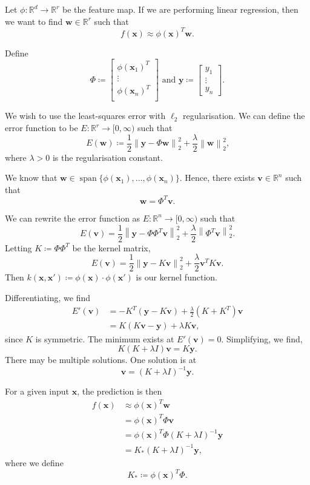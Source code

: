 \documentclass[11pt,twoside]{report}
\newcommand\bv{\mathbf{v}}
\newcommand\bw{\mathbf{w}}
\newcommand\bx{\mathbf{x}}
\newcommand\by{\mathbf{y}}
\newcommand\bbR{\mathbb{R}}
\newcommand\norm[1]{\left\|#1\right\|}
\DeclareMathOperator{\spn}{span}
\begin{document}
Let $\phi : \bbR^d \to \bbR^r$ be the feature map. If we are performing linear regression, then we want to find $\bw \in \bbR^r$ such that \[
    f(\bx) \approx \phi(\bx)^T \bw \text{.}
\]

Define \[
    \Phi \coloneqq \begin{bmatrix}
        \phi(\bx_1)^T \\
        \vdots \\
        \phi(\bx_n)^T \\
    \end{bmatrix} \text{ and }\by \coloneqq \begin{bmatrix}
        y_1 \\
        \vdots \\
        y_n
    \end{bmatrix} \text{.}
\]

We wish to use the least-squares error with $\ell_2$ regularisation. We can define the error function to be $E : \bbR^r \to [0, \infty)$ such that \[
    E(\bw) \coloneqq \frac{1}{2}\norm{\by - \Phi\bw}_2^2 + \frac{\lambda}{2} \norm{\bw}_2^2 \text{,}
\] where $\lambda > 0$ is the regularisation constant.

We know that $\bw \in \spn\{\phi(\bx_1), \dots, \phi(\bx_n)\}$. Hence, there exists $\bv \in \bbR^n$ such that \[
    \bw = \Phi^T\bv \text{.}
\]

We can rewrite the error function as $E : \bbR^n \to [0, \infty)$ such that \[
    E(\bv) = \frac{1}{2}\norm{\by - \Phi\Phi^T\bv}_2^2 + \frac{\lambda}{2} \norm{\Phi^T\bv}_2^2 \text{.}
\] Letting $K \coloneqq \Phi\Phi^T$ be the kernel matrix,\[
    E(\bv) = \frac{1}{2}\norm{\by - K\bv}_2^2 + \frac{\lambda}{2} \bv^T K \bv \text{.}
\] Then $k(\bx, \bx') \coloneqq \phi(\bx) \cdot \phi(\bx')$ is our kernel function.

Differentiating, we find \begin{align*}
    E'(\bv) &= -K^T(\by - K\bv) + \frac{\lambda}{2} (K + K^T)\bv \\
    &= K(K\bv - \by) + \lambda K\bv \text{,}
\end{align*} since $K$ is symmetric. The minimum exists at $E'(\bv) = 0$. Simplifying, we find,\[
    K(K + \lambda I)\bv = K\by \text{.}
\] There may be multiple solutions. One solution is at \[
    \bv = (K + \lambda I)^{-1}\by \text{.}
\]

For a given input $\bx$, the prediction is then \begin{align*}
    f(\bx) &\approx \phi(\bx)^T \bw \\
    &= \phi(\bx)^T \Phi \bv \\
    &= \phi(\bx)^T \Phi (K + \lambda I)^{-1}\by \\
    &= K_* (K + \lambda I)^{-1}\by \text{,}
\end{align*} where we define \[
    K_* \coloneqq \phi(\bx)^T \Phi \text{.}
\]
\end{document}
